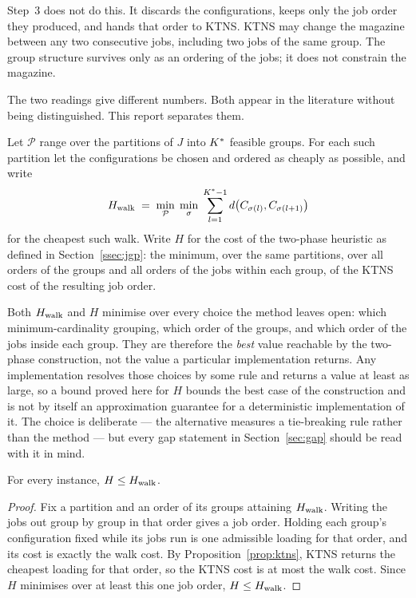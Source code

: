 Step~3 does not do this. It discards the configurations, keeps only the job order
they produced, and hands that order to KTNS. KTNS may change the magazine between
any two consecutive jobs, including two jobs of the same group. The group structure
survives only as an ordering of the jobs; it does not constrain the magazine.

The two readings give different numbers. Both appear in the literature without being
distinguished. This report separates them.

\begin{definition}\label{def:frames}
Let $\mathcal{P}$ range over the partitions of $J$ into $K^{\ast}$ feasible groups. For
each such partition let the configurations be chosen and ordered as cheaply as
possible, and write
\[
  H_{\mathrm{walk}}
  \;=\;\min_{\mathcal{P}}\;\min_{\sigma}\;
        \sum_{l=1}^{K^{\ast}-1} d\bigl(C_{\sigma(l)},C_{\sigma(l+1)}\bigr)
\]
for the cheapest such walk. Write $H$ for the cost of the two-phase heuristic as
defined in Section~\ref{ssec:jgp}: the minimum, over the same partitions, over all
orders of the groups and all orders of the jobs within each group, of the KTNS cost
of the resulting job order.
\end{definition}

\begin{remark}\label{rem:envelope}
Both $H_{\mathrm{walk}}$ and $H$ minimise over every choice the method leaves open: which
minimum-cardinality grouping, which order of the groups, and which order of the jobs
inside each group. They are therefore the \emph{best} value reachable by the two-phase
construction, not the value a particular implementation returns. Any implementation
resolves those choices by some rule and returns a value at least as large, so a bound
proved here for $H$ bounds the best case of the construction and is not by itself an
approximation guarantee for a deterministic implementation of it. The choice is
deliberate --- the alternative measures a tie-breaking rule rather than the method ---
but every gap statement in Section~\ref{sec:gap} should be read with it in mind.
\end{remark}

\begin{proposition}\label{prop:frames}
For every instance, $H\le H_{\mathrm{walk}}$.
\end{proposition}

\begin{proof}
Fix a partition and an order of its groups attaining $H_{\mathrm{walk}}$. Writing the jobs out
group by group in that order gives a job order. Holding each group's configuration
fixed while its jobs run is one admissible loading for that order, and its cost is
exactly the walk cost. By Proposition~\ref{prop:ktns}, KTNS returns the cheapest
loading for that order, so the KTNS cost is at most the walk cost. Since $H$
minimises over at least this one job order, $H\le H_{\mathrm{walk}}$.
\end{proof}

